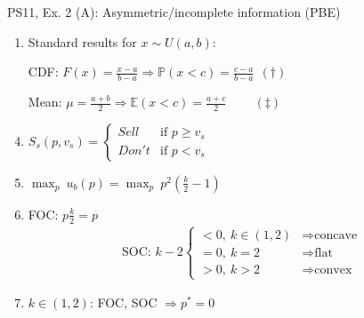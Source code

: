 \begin{frame}{PS11, Ex. 2 (A): Asymmetric/incomplete information (PBE)}
\begin{multicols}{2}
      \vfill\null\columnbreak
      \begin{enumerate}
        \item \vspace{-2pt} Standard results for $x\sim U(a, b):$
        \item[CDF:] \vspace{-2pt} $F(x)=\frac{x-a}{b-a}\Rightarrow\mathbb{P}(x<c)=\frac{c-a}{b-a}\ \ (\dagger)$
        \item[Mean:] \vspace{-2pt}  $\mu=\frac{a+b}{2}\Rightarrow\mathbb{E}(x<c)=\frac{a+c}{2}\quad\quad\ (\ddagger)$
        \item \vspace{-2pt} $S_s(p,v_s)=\left\{\begin{array}{ll}
          Sell  & \text{if }p\geq v_s \\
          Don't & \text{if }p < v_s
        \end{array}\right.$
        \item \vspace{-2pt} $\displaystyle{\max_p}\ u_b(p)=\displaystyle{\max_p}\ p^2\left(\frac{k}{2}-1\right)$
        \item \vspace{-2pt} FOC: $p\frac{k}{2}=p$\vspace{-6pt}
        \begin{align*}
          \text{SOC: }k-2\left\{\begin{array}{ll}
              <0,\ k\in(1,2)&\Rightarrow\text{concave}\\
              =0,\ k=2&\Rightarrow\text{flat}\\
              >0,\ k>2&\Rightarrow\text{convex}
          \end{array}\right.
        \end{align*}
        \item \vspace{-6pt} $k\in(1,2)$: FOC, SOC $\Rightarrow p^*=0$
      \end{enumerate}
      \vfill\null
    \end{multicols}
\end{frame}
